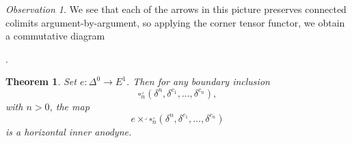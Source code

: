 \documentclass{amsart}
\numberwithin{equation}{section}
\theoremstyle{plain}   %
\newtheorem{thm}[subsection]{Theorem}
\theoremstyle{remark}
\newtheorem{obs}[subsection]{Observation}
\theoremstyle{plain}
\DeclareMathOperator{\id}{id}
\newcommand{\overcat}[2]{{\left(#1\downarrow #2\right)}}
\newcommand{\psh}[1]{\ensuremath{\widehat{#1}}}
\newcommand{\C}{\ensuremath{\mathcal{C}}}
\newcommand{\cellset}{\ensuremath{\widehat{\Theta[\mathcal{C}]}}}
\begin{document}
\begin{obs}
	We see that each of the arrows in this picture preserves connected colimits argument-by-argument, so applying the corner tensor functor, we obtain a commutative diagram
	\begin{center}
		.
	\end{center}
\end{obs}
\begin{thm}\label{joyalisothm}
	Set \(e:\Delta^0\to E^1\). Then for any boundary inclusion 
	\[\square_n^\lrcorner(\delta^n,\delta^{c_1},\dots,\delta^{c_n}),\]
	with \(n>0\), the map 
	\[e \times^\lrcorner \square_n^\lrcorner(\delta^n,\delta^{c_1},\dots,\delta^{c_n})\]
	is a horizontal inner anodyne.
\end{thm}
\end{document}
